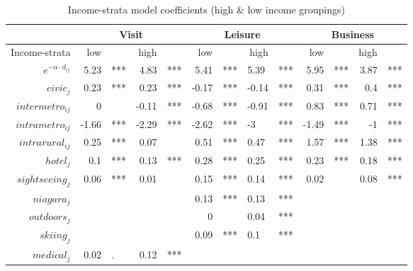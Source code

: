 \begin{table}[H]
\centering
\caption{Income-strata model coefficients (high \& low income groupings)}
\label{table:income-strata-coeff}
\begin{tabular}{r|rl|rl|rl|rl|rl|rl}
\multicolumn{1}{c}{} & \multicolumn{4}{c}{Visit} & \multicolumn{4}{c}{Leisure} & \multicolumn{4}{c}{Business} \\ \hline
Income-strata & low &  & high &  & low &  & high &  & low &  & high &  \\ \hline
$e^{-\alpha \cdot d_{ij}}$ & \multicolumn{1}{r}{5.23} & *** & 4.83 & *** & 5.41 & *** & \multicolumn{1}{l}{5.39} & *** & 5.95 & *** & 3.87 & *** \\
$civic_j$ & \multicolumn{1}{r}{0.23} & *** & 0.23 & *** & -0.17 & *** & \multicolumn{1}{l}{-0.14} & *** & 0.31 & *** & 0.4 & *** \\
$intermetro_{ij}$ & \multicolumn{1}{r}{0} &  & -0.11 & *** & -0.68 & *** & \multicolumn{1}{l}{-0.91} & *** & 0.83 & *** & 0.71 & *** \\
$intrametro_{ij}$ & \multicolumn{1}{r}{-1.66} & *** & -2.29 & *** & -2.62 & *** & \multicolumn{1}{l}{-3} & *** & -1.49 & *** & -1 & *** \\
$intrarural_{ij}$ & \multicolumn{1}{r}{0.25} & *** & 0.07 &  & 0.51 & *** & \multicolumn{1}{l}{0.47} & *** & 1.57 & *** & 1.38 & *** \\
$hotel_j$ & \multicolumn{1}{r}{0.1} & *** & 0.13 & *** & 0.28 & *** & \multicolumn{1}{l}{0.25} & *** & 0.23 & *** & 0.18 & *** \\
$sightseeing_j$ & \multicolumn{1}{r}{0.06} & *** & 0.01 &  & 0.15 & *** & \multicolumn{1}{l}{0.14} & *** & 0.02 &  & 0.08 & *** \\
$niagara_j$ & \multicolumn{1}{r}{} &  &  &  & 0.13 & *** & \multicolumn{1}{l}{0.13} & *** &  &  &  &  \\
$outdoors_j$ & \multicolumn{1}{r}{} &  &  &  & 0 &  & \multicolumn{1}{l}{0.04} & *** &  &  &  &  \\
$skiing_j$ & \multicolumn{1}{r}{} &  &  &  & 0.09 & *** & \multicolumn{1}{l}{0.1} & *** &  &  &  &  \\
$medical_j$ & \multicolumn{1}{r}{0.02} & . & 0.12 & *** &  &  & \multicolumn{1}{l}{} &  &  &  &  &  \\ \hline
\end{tabular}
\end{table}


